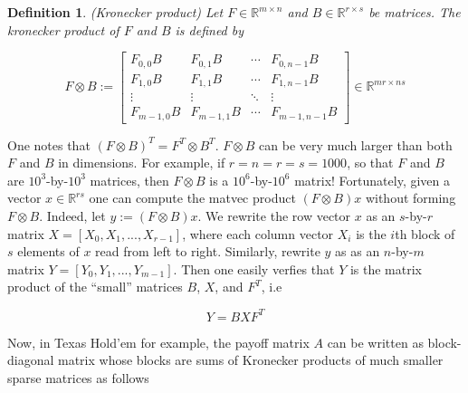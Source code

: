 \documentclass{article} %
\newtheorem{definition}[theorem]{Definition}
\begin{document}
\begin{definition}(Kronecker product)
Let $F \in \mathbb{R}^{m \times n}$ and $B \in \mathbb{R}^{r \times
  s}$ be matrices. The kronecker product of $F$ and $B$ is defined by

\begin{equation}
F \otimes B:=\left[
\begin{array}{cccc}
F_{0,0}B & F_{0,1}B & \cdots & F_{0,n-1}B \\
F_{1,0}B & F_{1,1}B & \cdots & F_{1,n-1}B \\
\vdots & \vdots & \ddots & \vdots\\
F_{m-1,0}B & F_{m-1,1}B & \cdots & F_{m-1,n-1}B 
\end{array}\right] \in \mathbb{R}^{mr \times ns}
\end{equation}
\end{definition}

One notes that $(F \otimes B)^T = F^T \otimes B^T$.
$F \otimes B$ can be very much larger than both $F$ and $B$ in
dimensions. For example, if $r = n = r = s = 1000$, so that $F$ and
$B$ are $10^3$-by-$10^3$ matrices, then $F \otimes B$ is a
$10^6$-by-$10^6$ matrix! Fortunately, given a vector $x \in
\mathbb{R}^{rs}$ one can compute the matvec product $(F \otimes B)x$
without forming $F \otimes B$. Indeed, let $y := (F \otimes B)x$. We
rewrite the row vector $x$ as an $s$-by-$r$ matrix $X = [X_0, X_1,
  ..., X_{r-1}]$, where each column vector $X_i$ is the $i$th block of
$s$ elements of $x$ read from left to right. Similarly, rewrite $y$ as
as an $n$-by-$m$ matrix $Y = [Y_0, Y_1, ..., Y_{m-1}]$. Then one
easily verfies that $Y$ is the matrix product of the ``small''
matrices $B$, $X$, and $F^T$, i.e

\begin{equation}
  \label{eq:kron_matvec}
  Y = BXF^T
\end{equation}

Now, in Texas Hold'em for example, the payoff matrix $A$ can be
written as block-diagonal matrix whose blocks are sums of Kronecker
products of much smaller sparse matrices as follows
\end{document}
